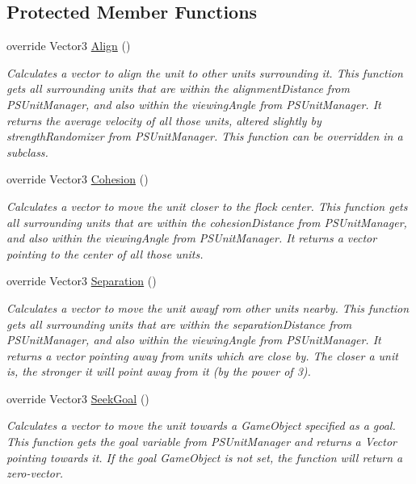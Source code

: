 \subsection*{Protected Member Functions}
\begin{DoxyCompactItemize}
\item 
override Vector3 \hyperlink{class_p_s_custom_flocker_a50d8ac4146196420bcf1181289a27e40}{Align} ()
\begin{DoxyCompactList}\small\item\em Calculates a vector to align the unit to other units surrounding it. This function gets all surrounding units that are within the alignment\+Distance from P\+S\+Unit\+Manager, and also within the viewing\+Angle from P\+S\+Unit\+Manager. It returns the average velocity of all those units, altered slightly by strength\+Randomizer from P\+S\+Unit\+Manager. This function can be overridden in a subclass. \end{DoxyCompactList}\item 
override Vector3 \hyperlink{class_p_s_custom_flocker_a46d7ff69872c12983a666293794b976f}{Cohesion} ()
\begin{DoxyCompactList}\small\item\em Calculates a vector to move the unit closer to the flock center. This function gets all surrounding units that are within the cohesion\+Distance from P\+S\+Unit\+Manager, and also within the viewing\+Angle from P\+S\+Unit\+Manager. It returns a vector pointing to the center of all those units. \end{DoxyCompactList}\item 
override Vector3 \hyperlink{class_p_s_custom_flocker_a2ab0990e603a5102fc80dafee1333c7c}{Separation} ()
\begin{DoxyCompactList}\small\item\em Calculates a vector to move the unit awayf rom other units nearby. This function gets all surrounding units that are within the separation\+Distance from P\+S\+Unit\+Manager, and also within the viewing\+Angle from P\+S\+Unit\+Manager. It returns a vector pointing away from units which are close by. The closer a unit is, the stronger it will point away from it (by the power of 3). \end{DoxyCompactList}\item 
override Vector3 \hyperlink{class_p_s_custom_flocker_a43590dd2fdf5f37d2116cf08473375c7}{Seek\+Goal} ()
\begin{DoxyCompactList}\small\item\em Calculates a vector to move the unit towards a Game\+Object specified as a goal. This function gets the goal variable from P\+S\+Unit\+Manager and returns a Vector pointing towards it. If the goal Game\+Object is not set, the function will return a zero-\/vector. \end{DoxyCompactList}\end{DoxyCompactItemize}
